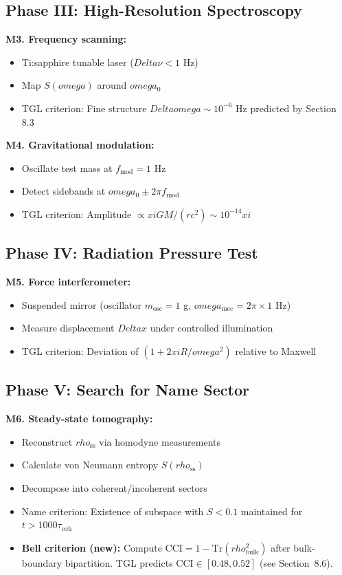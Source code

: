 \documentclass[12pt,a4paper]{article}
\def\xi{xi}%
\def\rho{rho}%
\def\omega{omega}%
\def\Delta{Delta}%
\begin{document}
\subsection{Phase III: High-Resolution Spectroscopy}

\textbf{M3. Frequency scanning:}
\begin{itemize}
    \item Ti:sapphire tunable laser ($\Delta\nu < 1$ Hz)
    \item Map $S(\omega)$ around $\omega_0$
    \item TGL criterion: Fine structure $\Delta\omega \sim 10^{-6}$ Hz predicted by Section 8.3
\end{itemize}

\textbf{M4. Gravitational modulation:}
\begin{itemize}
    \item Oscillate test mass at $f_{\text{mod}} = 1$ Hz
    \item Detect sidebands at $\omega_0 \pm 2\pi f_{\text{mod}}$
    \item TGL criterion: Amplitude $\propto \xi GM/(rc^2) \sim 10^{-14}\xi$
\end{itemize}

\subsection{Phase IV: Radiation Pressure Test}

\textbf{M5. Force interferometer:}
\begin{itemize}
    \item Suspended mirror (oscillator $m_{\text{osc}} = 1$ g, $\omega_{\text{mec}} = 2\pi \times 1$ Hz)
    \item Measure displacement $\Delta x$ under controlled illumination
    \item TGL criterion: Deviation of $(1 + 2\xi R/\omega^2)$ relative to Maxwell
\end{itemize}

\subsection{Phase V: Search for Name Sector}

\textbf{M6. Steady-state tomography:}
\begin{itemize}
    \item Reconstruct $\rho_{\text{ss}}$ via homodyne measurements
    \item Calculate von Neumann entropy $S(\rho_{\text{ss}})$
    \item Decompose into coherent/incoherent sectors
    \item Name criterion: Existence of subspace with $S < 0.1$ maintained for $t > 1000\tau_{\text{coh}}$
    \item \textbf{Bell criterion (new):} Compute $\mathrm{CCI} = 1 - \mathrm{Tr}(\rho_{\mathrm{bulk}}^2)$ after bulk-boundary bipartition. TGL predicts $\mathrm{CCI} \in [0.48, 0.52]$ (see Section~8.6).
\end{itemize}
\end{document}
